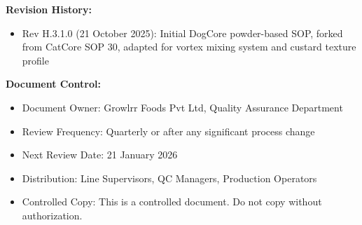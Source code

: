 \vspace{1em}
\noindent\textbf{Revision History:}
\begin{itemize}[leftmargin=1.5em]
\item Rev H.3.1.0 (21 October 2025): Initial DogCore powder-based SOP, forked from CatCore SOP 30, adapted for vortex mixing system and custard texture profile
\end{itemize}

\vspace{1em}
\noindent\textbf{Document Control:}
\begin{itemize}[leftmargin=1.5em]
\item Document Owner: Growlrr Foods Pvt Ltd, Quality Assurance Department
\item Review Frequency: Quarterly or after any significant process change
\item Next Review Date: 21 January 2026
\item Distribution: Line Supervisors, QC Managers, Production Operators
\item Controlled Copy: This is a controlled document. Do not copy without authorization.
\end{itemize}

